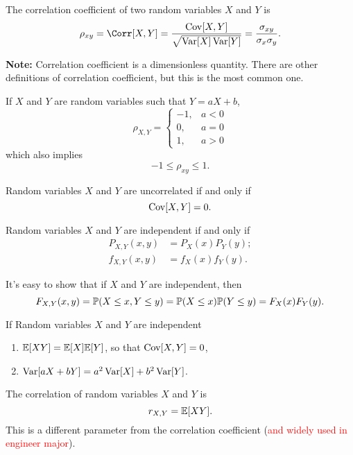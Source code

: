 \begin{definition}
    The correlation coefficient of two random variables $X$ and $Y$ is
    \[\rho_{xy}=\Corr[X,Y]=\frac{\Cov[X,Y]}{\sqrt{\Var[X]\Var[Y]}}=\frac{\sigma_{xy}}{\sigma_x\sigma_y}.\]
\end{definition}
\textbf{Note:} Correlation coefficient is a dimensionless quantity. There are other definitions of correlation coefficient, but this is the most common one.

\begin{theorem}
    If $X$ and $Y$ are random variables such that $Y=aX+b$,
    \[\rho_{X,Y}={
        \begin{cases}
            -1, & a<0\\
            0, & a=0\\
            1, & a>0
        \end{cases}
    }\]
    which also implies
    \[-1\leq \rho_{xy}\leq 1.\]
\end{theorem}

\begin{definition}
    [Uncorrelatedness]
    Random variables $X$ and $Y$ are uncorrelated if and only if
    \[\mathop{\mathrm{Cov}}\nolimits[X,Y]=0.\]
\end{definition}

\begin{definition}[Independence]
    Random variables $X$ and $Y$ are independent if and only if
    \begin{align}
        P_{X,Y}(x,y) &=P_X(x)P_Y(y); \tag{Discrete}\\
        f_{X,Y}(x,y) &=f_X(x)f_Y(y). \tag{Continuous}
    \end{align}
\end{definition}
It's easy to show that if $X$ and $Y$ are independent, then
\[F_{X,Y}(x,y)=\P{X\leq x, Y\leq y}=\P{X\leq x}\P{Y\leq y}=F_X(x)F_Y(y).\]

\begin{theorem}
    If Random variables $X$ and $Y$ are independent
    \begin{enumerate}
        \item $\E{XY}=\E{X}\E{Y}$, so that $\mathop{\mathrm{Cov}}\nolimits[X, Y]=0$,
        \item $\mathop{\mathrm{Var}}\nolimits[aX+bY]=a^2\mathop{\mathrm{Var}}\nolimits[X]+b^2\mathop{\mathrm{Var}}\nolimits[Y]$.
    \end{enumerate}
\end{theorem}

\begin{definition}
    [Correlation]
    The correlation of random variables $X$ and $Y$ is
    \[r_{X,Y} = \E{XY}.\]
    This is a different parameter from the correlation coefficient (\textcolor{red}{and widely used in engineer major}).
\end{definition}

